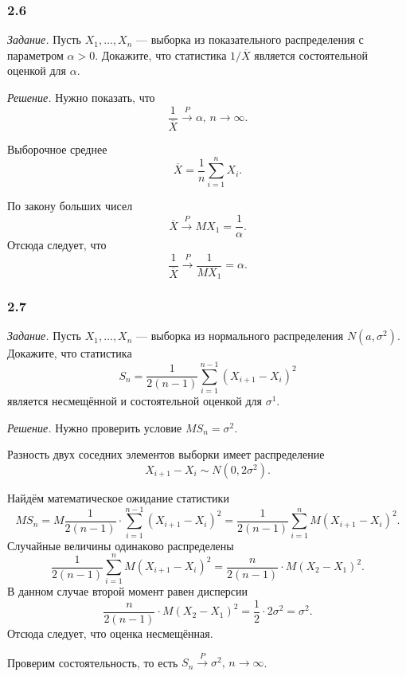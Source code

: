 \subsubsection*{2.6}

\textit{Задание.}
Пусть $X_1, \dotsc, X_n$ --- выборка из показательного распределения с параметром $ \alpha > 0$.
Докажите, что статистика $1 / \overline{X}$ является состоятельной оценкой для $ \alpha $.

\textit{Решение.} Нужно показать, что
$$ \frac{1}{ \overline{X}} \overset{P}{ \rightarrow } \alpha, \,
   n \to \infty.$$

Выборочное среднее
$$ \overline{X} =
  \frac{1}{n} \sum \limits_{i = 1}^n X_i.$$

По закону больших чисел
$$ \overline{X} \overset{P}{ \rightarrow }
  MX_1 =
  \frac{1}{ \alpha }.$$
Отсюда следует, что
$$ \frac{1}{ \overline{X}} \overset{P}{ \rightarrow }
  \frac{1}{MX_1} =
  \alpha.$$

\subsubsection*{2.7}

\textit{Задание.}
Пусть $X_1, \dotsc, X_n$ --- выборка из нормального распределения $N \left( a, \sigma^2 \right) $.
Докажите, что статистика
$$S_n =
  \frac{1}{2 \left( n - 1 \right) } \sum \limits_{i = 1}^{n - 1} \left( X_{i + 1} - X_i \right)^2$$
является несмещённой и состоятельной оценкой для $ \sigma^1$.

\textit{Решение.} Нужно проверить условие $MS_n = \sigma^2$.

Разность двух соседних элементов выборки имеет распределение
$$X_{i + 1} - X_i \sim
  N \left( 0, 2 \sigma^2 \right).$$

Найдём математическое ожидание статистики
$$MS_n =
  M \frac{1}{2 \left( n - 1 \right) } \cdot
  \sum \limits_{i = 1}^{n - 1} \left( X_{i + 1} - X_i \right)^2 =
  \frac{1}{2 \left( n - 1 \right) } \sum \limits_{i = 1}^n M \left( X_{i + 1} - X_i \right)^2.$$
Случайные величины одинаково распределены
$$ \frac{1}{2 \left( n - 1 \right) } \sum \limits_{i = 1}^n M \left( X_{i + 1} - X_i \right)^2 =
  \frac{n}{2 \left( n - 1 \right) } \cdot M \left( X_2 - X_1 \right)^2.$$
В данном случае второй момент равен  дисперсии
$$ \frac{n}{2 \left( n - 1 \right) } \cdot M \left( X_2 - X_1 \right)^2 =
  \frac{1}{2} \cdot 2 \sigma^2 =
  \sigma^2.$$
Отсюда следует, что оценка несмещённая.

Проверим состоятельность, то есть $S_n \overset{P}{ \rightarrow } \sigma^2, \, n \to \infty $.


